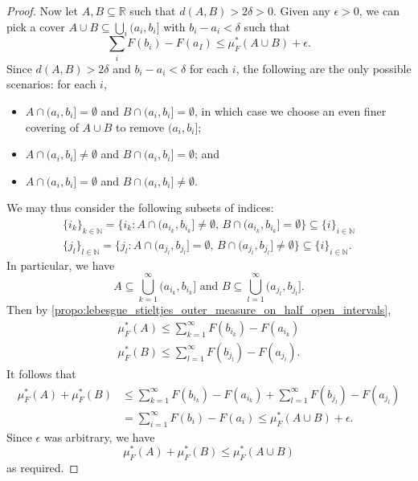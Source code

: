 \documentclass[notoc,notitlepage]{tufte-book}
\begin{document}
\begin{proof}
  Now let $A, B \subseteq \mathbb{R}$ such that $d(A, B) > 2\delta > 0$.
  Given any $\epsilon > 0$, we can pick a cover $A \cup B \subseteq \bigcup_{i}
  (a_i, b_i]$ with $b_i - a_i < \delta$ such that
  \begin{equation*}
    \sum_{i} F(b_i) - F(a_I) \leq \mu_F^*(A \cup B) + \epsilon.
  \end{equation*}
  Since $d(A, B) > 2\delta$ and $b_i - a_i < \delta$ for each $i$,
  the following are the only possible scenarios:
  for each $i$,
  \begin{itemize}
    \item $A \cap (a_i, b_i] = \emptyset$ and $B \cap (a_i, b_i] = \emptyset$,
      in which case we choose an even finer covering of $A \cup B$
      to remove $(a_i, b_i]$;
    \item $A \cap (a_i, b_i] \neq \emptyset$
      and $B \cap (a_i, b_i] = \emptyset$; and
    \item $A \cap (a_i, b_i] = \emptyset$ and
      $B \cap (a_i, b_i] \neq \emptyset$.
  \end{itemize}
  We may thus consider the following subsets of indices:
  \begin{gather*}
    \{ i_k \}_{k \in \mathbb{N}}
    = \{ i_k : A \cap (a_{i_k}, b_{i_k}] \neq \emptyset,\,
        B \cap (a_{i_k}, b_{i_k}] = \emptyset \}
      \subseteq \{ i \}_{i \in \mathbb{N}} \\
    \{ j_l \}_{l \in \mathbb{N}}
    = \{ j_l : A \cap (a_{j_l}, b_{j_l}] = \emptyset,\,
        B \cap (a_{j_l}, b_{j_l}] \neq \emptyset \}
      \subseteq \{ i \}_{i \in \mathbb{N}}.
  \end{gather*}
  In particular, we have
  \begin{equation*}
    A \subseteq \bigcup_{k=1}^{\infty} (a_{i_k}, b_{i_k}] \text{ and }
    B \subseteq \bigcup_{l=1}^{\infty} (a_{j_l}, b_{j_l}].
  \end{equation*}
  Then by \cref{propo:lebesgue_stieltjes_outer_measure_on_half_open_intervals},
  \begin{gather*}
    \mu_F^*(A) \leq \sum_{k=1}^{\infty} F(b_{i_k}) - F(a_{i_k}) \\
    \mu_F^*(B) \leq \sum_{l=1}^{\infty} F(b_{j_l}) - F(a_{j_l}).
  \end{gather*}
  It follows that
  \begin{align*}
    \mu_F^*(A) + \mu_F^*(B)
    &\leq \sum_{k=1}^{\infty} F(b_{i_k}) - F(a_{i_k})
    + \sum_{l=1}^{\infty} F(b_{j_l}) - F(a_{j_l}) \\
    &= \sum_{i=1}^{\infty} F(b_i) - F(a_i)
    \leq \mu_F^*(A \cup B) + \epsilon.
  \end{align*}
  Since $\epsilon$ was arbitrary, we have
  \begin{equation*}
    \mu_F^*(A) + \mu_F^*(B) \leq \mu_F^*(A \cup B)
  \end{equation*}
  as required.
\end{proof}
\end{document}
